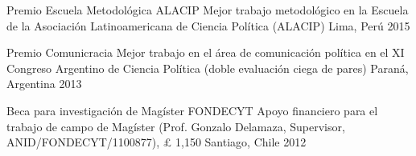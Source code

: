 


\begin{cvhonors}
\cvhonor
{Premio Escuela Metodológica ALACIP}
{Mejor trabajo metodológico en la Escuela de la Asociación Latinoamericana de Ciencia Política (ALACIP)}
{Lima, Perú}
{2015}
\end{cvhonors}

\vspace{1mm}





\begin{cvhonors}
\cvhonor
{Premio Comunicracia}
{Mejor trabajo en el área de comunicación política en el XI Congreso Argentino de Ciencia Política (doble evaluación ciega de pares)} %
{Paraná, Argentina}
{2013}
\end{cvhonors}

\vspace{1mm}


\vspace{1mm}

\begin{cvhonors}
\cvhonor
{Beca para investigación de Mag\'ister FONDECYT}
{Apoyo financiero para el trabajo de campo de Magíster (Prof. Gonzalo Delamaza, Supervisor, ANID/FONDECYT/1100877), {\pounds} 1,150}
{Santiago, Chile}
{2012}
\end{cvhonors}

\vspace{1mm}
